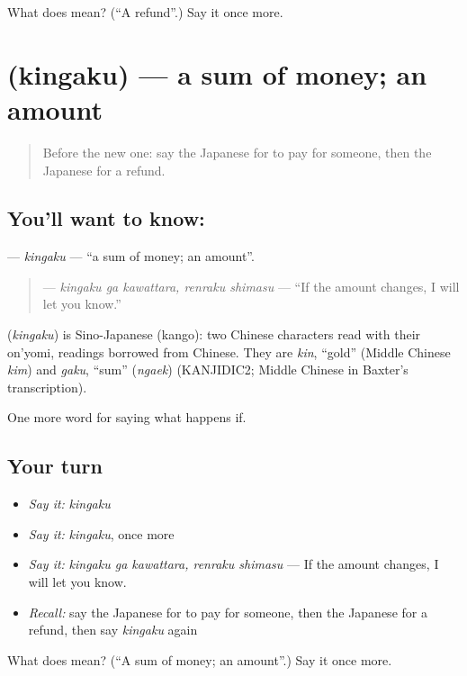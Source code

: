 \begin{tcolorbox}[breakable,colback=teal!4,colframe=teal!35!black,title={Before you move on}]
What does  mean? (\textquotedblleft{}A refund\textquotedblright{}.) Say it once more.
\end{tcolorbox}
\section[\texorpdfstring{\ja{きんがく} (kingaku)}{きんがく (kingaku)}]{ (kingaku) — a sum of money; an amount}

\label{lesson:JA-C359-kingaku}



\begin{quote}
Before the new one: say the Japanese for to pay for someone, then the Japanese for a refund.
\end{quote}

\subsection*{You'll want to know: }
\textbf{} — \emph{kingaku} — \textquotedblleft{}a sum of money; an amount\textquotedblright{}.

\begin{quote}
\textbf{ } — \emph{kingaku ga kawattara, renraku shimasu} — \textquotedblleft{}If the amount changes, I will let you know.\textquotedblright{}
\end{quote}

\begin{cousinweb}
\textbf{} (\emph{kingaku}) is Sino-Japanese (kango): two Chinese characters read with their on'yomi, readings borrowed from Chinese. They are \emph{kin}, \textquotedblleft{}gold\textquotedblright{} (Middle Chinese \emph{kim}) and \emph{gaku}, \textquotedblleft{}sum\textquotedblright{} (\emph{ngaek}) (KANJIDIC2; Middle Chinese in Baxter's transcription).
\end{cousinweb}

\begin{grammarlens}[title={What you've built}]
One more word for saying what happens if.
\end{grammarlens}

\subsection*{Your turn}
\begin{itemize}
\raggedright
  \item \emph{Say it:} \emph{kingaku}
  \item \emph{Say it:} \emph{kingaku}, once more
  \item \emph{Say it:} \emph{kingaku ga kawattara, renraku shimasu} — If the amount changes, I will let you know.
  \item \emph{Recall:} say the Japanese for to pay for someone, then the Japanese for a refund, then say \emph{kingaku} again
\end{itemize}

\begin{tcolorbox}[breakable,colback=teal!4,colframe=teal!35!black,title={Before you move on}]
What does  mean? (\textquotedblleft{}A sum of money; an amount\textquotedblright{}.) Say it once more.
\end{tcolorbox}
